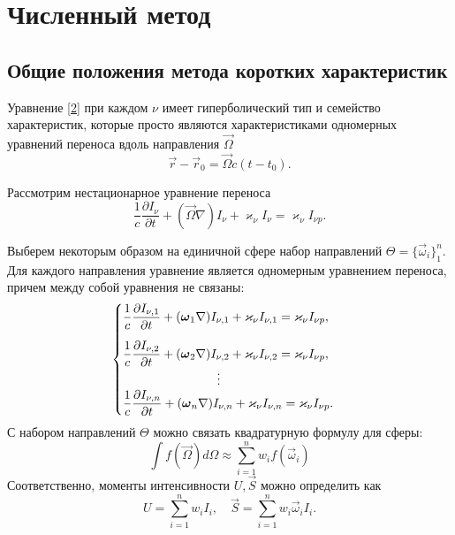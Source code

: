 \chapter{Численный метод}

\section{Общие положения метода коротких характеристик}
Уравнение \eqref{2} при каждом $\nu$ имеет гиперболический тип и семейство характеристик, которые просто являются характеристиками одномерных уравнений переноса вдоль направления $\vec\Omega$ 
\begin {equation}
\vec r - \vec r_0 = \vec \Omega c(t-t_0).
\end {equation}

Рассмотрим нестационарное уравнение переноса
\begin {equation}
\frac{1}{c}\frac{\partial I_{\nu}}{\partial t} + (\vec\Omega \nabla) I_{\nu} + \varkappa_\nu I_\nu = \varkappa_{\nu} I_{\nu p}.
\end {equation}

Выберем некоторым образом на единичной сфере набор направлений $\Theta = \{\vec\omega_i\}_1^n$. Для каждого направления уравнение является одномерным уравнением переноса, причем между собой уравнения не связаны:
\begin {equation}
\begin {cases}
\dfrac{1}{c} \dfrac{\partial I_{\nu,1}}{\partial t} + (\vec\omega_1 \nabla) I_{\nu,1} + \varkappa_\nu I_{\nu,1} = \varkappa_{\nu} I_{\nu p}, \\[12pt]
\dfrac{1}{c} \dfrac{\partial I_{\nu,2}}{\partial t} + (\vec\omega_2 \nabla) I_{\nu,2} + \varkappa_\nu I_{\nu,2} = \varkappa_{\nu} I_{\nu p},\\
\hspace{7,65em}\vdots \\
\dfrac{1}{c} \dfrac{\partial I_{\nu,n}}{\partial t} + (\vec\omega_n \nabla) I_{\nu,n} + \varkappa_\nu I_{\nu,n} = \varkappa_{\nu} I_{\nu p}.
\label {8}
\end {cases}
\end {equation}
С набором направлений $\Theta$ можно связать квадратурную формулу для сферы:
\begin {equation}
\int f(\vec\Omega)d\Omega \approx \sum_{i=1}^n w_i f(\vec \omega_i)
\end {equation}
Соответственно, моменты интенсивности $U, \vec S$ можно определить как
\begin {equation}
U = \sum_{i=1}^n w_i I_i, \quad
\vec S = \sum_{i=1}^n w_i \vec \omega_i I_i.
\end {equation}


